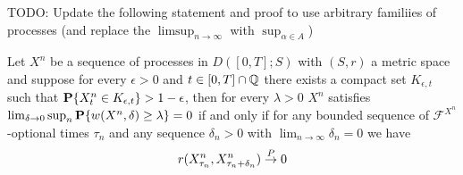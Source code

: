 TODO: Update the following statement and proof to use arbitrary familiies of processes (and replace the $\limsup_{n \to \infty}$ with $\sup_{\alpha \in A}$)
\begin{thm}Let $X^n$ be a sequence of processes in $D([0,T];S)$ with $(S,r)$ a metric space and suppose for every $\epsilon > 0$ and $t \in [0,T] \cap \mathbb{Q}$ there exists a compact set $K_{\epsilon,t}$ such that $\textbf{P}\{X^n_t \in K_{\epsilon,t}\} > 1 - \epsilon$, then for every $\lambda > 0$ $X^n$ satisfies $\lim_{\delta \to 0} \sup_n \textbf{P}\{w(X^n, \delta) \geq \lambda\} =0$ if and only if for any bounded sequence of $\mathcal{F}^{X^n}$-optional times $\tau_n$ and any sequence $\delta_n > 0$ with $\lim_{n \to \infty} \delta_n =0$ we have
\begin{align*}
r(X^n_{\tau_n}, X^n_{\tau_n + \delta_n}) \overset{P}\to 0
\end{align*}
\end{thm}
